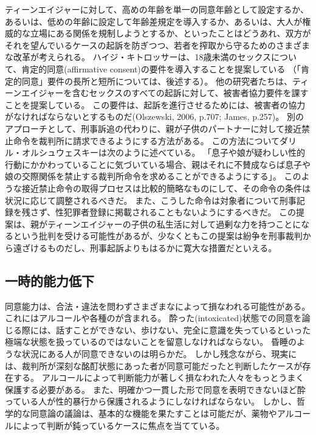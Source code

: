 \documentclass[paper=a4,book,openany]{jlreq}
\newcommand{\ig}[1]{}           %
\begin{document}
ティーンエイジャーに対して、高めの年齢を単一の同意年齢として設定するか、あるいは、低めの年齢に設定して年齢差規定を導入するか、あるいは、大人が権威的な立場にある関係を規制しようとするか、といったことはどうあれ、双方がそれを望んでいるケースの起訴を防ぎつつ、若者を搾取から守るためのさまざまな改革が考えられる。
ハイジ・キトロッサーは、18歳未満のセックスについて、肯定的同意(affirmative consent)の要件を導入することを提案している\citep{kitrosser97:_meanin_consen}
（「肯定的同意」要件の長所と短所については、後述する）。
他の研究者たちは、ティーンエイジャーを含むセックスのすべての起訴に対して、被害者協力要件を課すことを提案している。
この要件は、起訴を進行させるためには、被害者の協力がなければならないとするものだ(Olszewski, 2006, p.707; James, p.257)。
\nocite{olszewski06:_commen_statut_rape_wiscon}\nocite{james09:_romeo_juliet_were_sex_offen}
別のアプローチとして、刑事訴追の代わりに、親が子供のパートナーに対して接近禁止命令を裁判所に請求できるようにする方法がある。
この方法についてダリル・オルシュウェスキー\ig{Olszewski}は次のように述べている。
「息子や娘が疑わしい性的行動にかかわっていることに気づいている場合、親はそれに不賛成ならば息子や娘の交際関係を禁止する裁判所命令を求めることができるようにする」\citep[p.718]{olszewski06:_commen_statut_rape_wiscon}。
このような接近禁止命令の取得プロセスは比較的簡略なものにして、その命令の条件は状況に応じて調整されるべきだ。
また、こうした命令は対象者について刑事記録を残さず、性犯罪者登録に掲載されることもないようにするべきだ。
この提案は、親がティーンエイジャーの子供の私生活に対して過剰な力を持つことになるという批判を受ける可能性があるが、少なくともこの提案は紛争を刑事裁判から遠ざけるものだし、刑事起訴よりもはるかに寛大な措置だといえる。

\subsection{一時的能力低下}

同意能力は、合法・違法を問わずさまざまなによって損なわれる可能性がある。
これにはアルコールや各種のが含まれる。
酔った(intoxicated)状態での同意を論じる際には、話すことができない、歩けない、完全に意識を失っているといった極端な状態を扱っているのではないことを留意しなければならない。
昏睡のような状況にある人が同意できないのは明らかだ。
しかし残念ながら、現実には、裁判所が深刻な酩酊状態にあった者が同意可能だったと判断したケースが存在する。
アルコールによって判断能力が著しく損なわれた人々をもっとうまく保護する必要がある。
また、明確かつ一貫した形で同意を表明できないほど酔っている人が性的暴行から保護されるようにしなければならない。
しかし、哲学的な同意論の議論は、基本的な機能を果たすことは可能だが、薬物やアルコールによって判断が鈍っているケースに焦点を当てている。
\end{document}
